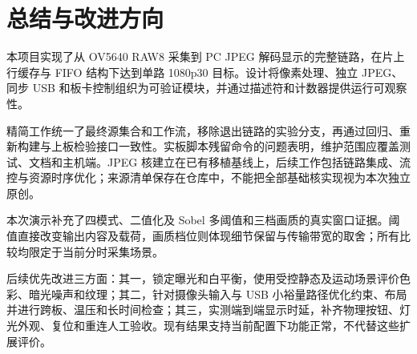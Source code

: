 \section{总结与改进方向}
本项目实现了从 OV5640 RAW8 采集到 PC JPEG 解码显示的完整链路，在片上行缓存与 FIFO 结构下达到单路 1080p30 目标。设计将像素处理、独立 JPEG、同步 USB 和板卡控制组织为可验证模块，并通过描述符和计数器提供运行可观察性。

精简工作统一了最终源集合和工作流，移除退出链路的实验分支，再通过回归、重新构建与上板检验接口一致性。实板脚本残留命令的问题表明，维护范围应覆盖测试、文档和主机端。JPEG 核建立在已有移植基线上，后续工作包括链路集成、流控与资源时序优化；来源清单保存在仓库中，不能把全部基础核实现视为本次独立原创。

本次演示补充了四模式、二值化及 Sobel 多阈值和三档画质的真实窗口证据。阈值直接改变输出内容及载荷，画质档位则体现细节保留与传输带宽的取舍；所有比较均限定于当前分时采集场景。

后续优先改进三方面：其一，锁定曝光和白平衡，使用受控静态及运动场景评价色彩、暗光噪声和纹理；其二，针对摄像头输入与 USB 小裕量路径优化约束、布局并进行跨板、温压和长时间检查；其三，实测端到端显示时延，补齐物理按钮、灯光外观、复位和重连人工验收。现有结果支持当前配置下功能正常，不代替这些扩展评价。


